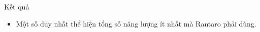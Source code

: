 Kết quả  
\begin{itemize}
	\item     Một số duy nhất thể hiện tổng số năng lượng ít nhất mà    Rantaro    phải dùng.   
\end{itemize}